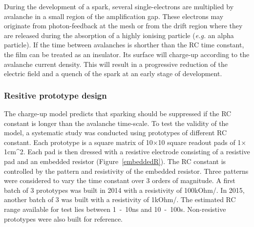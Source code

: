 \documentclass{article}
\begin{document}
During the development of a spark, several single-electrons are multiplied by avalanche in a small region of the amplification gap.
These electrons may originate from photon-feedback at the mesh or from the drift region where they are released during the absorption of a highly ionising particle (\textit{e.g.} an alpha particle). If the time between avalanches is shorther than the RC time constant, the film can be treated as an insulator. Its surface will charge-up according to the avalanche current density. This will result in a progressive reduction of the electric field and a quench of the spark at an early stage of development.

\subsubsection{Resitive prototype design}

The charge-up model predicts that sparking should be suppressed if the RC constant is longer than the avalanche time-scale.
To test the validity of the model, a systematic study was conducted using prototypes of different RC constant.
Each prototype is a square matrix of 10$\times$10 square readout pads of 1$\times$\unit{1}{cm^{2}}.
Each pad is then dressed with a resistive electrode consisting of a resistive pad and an embedded resistor (Figure~\ref{embeddedR}).
The RC constant is controlled by the pattern and resistivity of the embedded resistor.
Three patterns were considered to vary the time constant over 3 orders of magnitude.
A first batch of 3 prototypes was built in 2014 with a resistivity of \unit{100}{kOhm/\Box}.
In 2015, another batch of 3 was built with a resistivity of \unit{1}{kOhm/\Box}.
The estimated RC range available for test lies between \unit{1-10}{ns} and \unit{10-100}{\micro s}.
Non-resistive prototypes were also built for reference.
\end{document}
